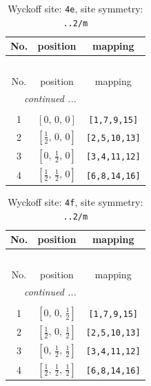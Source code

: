 \documentclass[fleqn,8pt]{jsarticle}
\begin{document}
\begin{longtable}{ccc}
\caption{Wyckoff site: {\tt 4e}, site symmetry: {\tt ..2/m}}
 \\
 \hline \hline
No. & position & mapping \\ \hline \endfirsthead

\multicolumn{2}{l}{\tablename\ \thetable{}} \\
 \hline \hline
No. & position & mapping \\ \hline \endhead

 \hline \hline
\multicolumn{2}{r}{\footnotesize\it continued ...} \\ \endfoot

 \hline \hline
\multicolumn{2}{r}{} \\ \endlastfoot

1 & $\left[ 0,\, 0,\, 0 \right]$ & {\tt [1,7,9,15]} \\ \hline
2 & $\left[ \frac{1}{2},\, 0,\, 0 \right]$ & {\tt [2,5,10,13]} \\ \hline
3 & $\left[ 0,\, \frac{1}{2},\, 0 \right]$ & {\tt [3,4,11,12]} \\ \hline
4 & $\left[ \frac{1}{2},\, \frac{1}{2},\, 0 \right]$ & {\tt [6,8,14,16]} \\
\end{longtable}
\renewcommand{\arraystretch}{1.2}
\begin{longtable}{ccc}
\caption{Wyckoff site: {\tt 4f}, site symmetry: {\tt ..2/m}}
 \\
 \hline \hline
No. & position & mapping \\ \hline \endfirsthead

\multicolumn{2}{l}{\tablename\ \thetable{}} \\
 \hline \hline
No. & position & mapping \\ \hline \endhead

 \hline \hline
\multicolumn{2}{r}{\footnotesize\it continued ...} \\ \endfoot

 \hline \hline
\multicolumn{2}{r}{} \\ \endlastfoot

1 & $\left[ 0,\, 0,\, \frac{1}{2} \right]$ & {\tt [1,7,9,15]} \\ \hline
2 & $\left[ \frac{1}{2},\, 0,\, \frac{1}{2} \right]$ & {\tt [2,5,10,13]} \\ \hline
3 & $\left[ 0,\, \frac{1}{2},\, \frac{1}{2} \right]$ & {\tt [3,4,11,12]} \\ \hline
4 & $\left[ \frac{1}{2},\, \frac{1}{2},\, \frac{1}{2} \right]$ & {\tt [6,8,14,16]} \\
\end{longtable}
\end{document}
